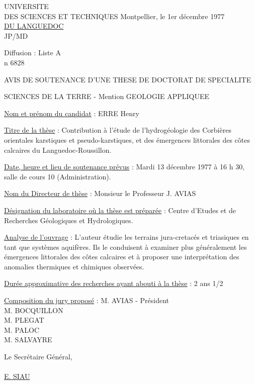 UNIVERSITE\\
DES SCIENCES ET TECHNIQUES \hfill Montpellier, le 1er décembre 1977\\
\uline{DU LANGUEDOC}\\
JP/MD

Diffusion : Liste A\\
n\textdegree{} 6828

AVIS DE SOUTENANCE D'UNE THESE DE DOCTORAT DE SPECIALITE

SCIENCES DE LA TERRE - Mention GEOLOGIE APPLIQUEE

\uline{Nom et prénom du candidat} : ERRE Henry

\uline{Titre de la thèse} : Contribution à l'étude de l'hydrogéologie des Corbières orientales karstiques et pseudo-karstiques, et des émergences littorales des côtes calcaires du Languedoc-Roussillon.

\uline{Date, heure et lieu de soutenance prévus} : Mardi 13 décembre 1977 à 16 h 30, salle de cours 10 (Administration).

\uline{Nom du Directeur de thèse} : Monsieur le Professeur J. AVIAS

\uline{Désignation du laboratoire où la thèse est préparée} : Centre d'Etudes et de Recherches Géologiques et Hydrologiques.

\uline{Analyse de l'ouvrage} : L'auteur étudie les terrains jura-cretacés et triasiques en tant que systèmes aquifères. Ils le conduisent à examiner plus généralement les émergences littorales des côtes calcaires et à proposer une interprétation des anomalies thermiques et chimiques observées.

\uline{Durée approximative des recherches ayant abouti à la thèse} : 2 ans 1/2

\uline{Composition du jury proposé} : M. AVIAS - Président\\
\hspace*{7em}M. BOCQUILLON\\
\hspace*{7em}M. PLEGAT\\
\hspace*{7em}M. PALOC\\
\hspace*{7em}M. SALVAYRE

Le Secrétaire Général,\\
\\
\uline{E. SIAU}
